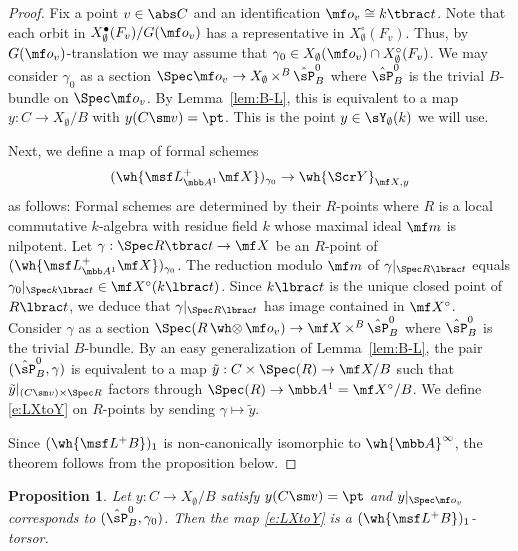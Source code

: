 \documentclass[final]{amsart}
\newtheorem{prop}[subsubsection]{Proposition}
\theoremstyle{remark}
\theoremstyle{definition}
\DeclareMathOperator*{\xt}{\times}
\DeclareMathOperator*{\hot}{\wh\otimes}
\numberwithin{equation}{section}
\begin{document}
\begin{proof}
Fix a point $v \in \abs C$ and an identification $\mf o_v \cong k\tbrac t$. 
Note that each orbit in $X_\emptyset^\bullet(F_v)/G(\mf o_v)$
has a representative in $X_\emptyset^\circ(F_v)$. 
Thus, by $G(\mf o_v)$-translation we may assume that $\gamma_0 \in X_\emptyset(\mf o_v) \cap X_\emptyset^\circ(F_v)$.
We may consider $\gamma_0$ as a section $\Spec \mf o_v \to X_\emptyset \xt^B \hat\sP_B^0$
where $\hat\sP_B^0$ is the trivial $B$-bundle on $\Spec \mf o_v$. 
By Lemma~\ref{lem:B-L}, this is equivalent to a map
$y: C \to X_\emptyset/B$ with $y(C\sm v) = \pt$. 
This is the point $y\in \sY_\emptyset(k)$ we will use. 

\smallskip

Next, we define a map of formal schemes
\begin{equation}  \label{e:LXtoY}
(\wh{\msf L^+_{\mbb A^1} \mf X})_{\gamma_0} \to \wh{\Scr Y}_{\mf X,y} 
\end{equation}
as follows: 
Formal schemes are determined by
their $R$-points where $R$ is a local commutative
$k$-algebra with residue field $k$ whose maximal ideal $\mf m$ is nilpotent. 
Let $\gamma : \Spec R\tbrac t \to \mf X$ be an $R$-point 
of $(\wh{\msf L^+_{\mbb A^1} \mf X})_{\gamma_0}$. 
The reduction modulo $\mf m$ of $\gamma|_{\Spec R\lbrac t}$ 
equals $\gamma_0|_{\Spec k\lbrac t} \in \mf X^\circ(k\lbrac t)$. 
Since $k\lbrac t$ is the unique closed point of $R\lbrac t$, 
we deduce that $\gamma|_{\Spec R\lbrac t}$ has image contained in $\mf X^\circ$. 
Consider $\gamma$ as a section $\Spec(R \hot \mf o_v) \to \mf X \xt^B \hat\sP_B^0$
where $\hat\sP_B^0$ is the trivial $B$-bundle. 
By an easy generalization of Lemma~\ref{lem:B-L}, 
the pair $(\hat\sP^0_B, \gamma)$ is equivalent to a map 
$\tilde y : C\times \Spec(R) \to \mf X/B$
such that $\tilde y|_{(C\sm v)\times \Spec R}$
factors through $\Spec(R) \to \mbb A^1 = \mf X^\circ/B$.
We define \eqref{e:LXtoY} on $R$-points by sending 
$\gamma \mapsto \tilde y$.

Since $(\wh{\msf L^+ B})_1$ is non-canonically isomorphic to 
$\wh{\mbb A}^\infty$, the theorem follows from 
the proposition below. 
\end{proof}

\begin{prop}\label{prop:DGKtorsor}
Let $y : C\to X_\emptyset/B$ satisfy $y(C\sm v)=\pt$ and $y|_{\Spec \mf o_v}$ corresponds
to $(\hat\sP_B^0, \gamma_0)$. 
Then the map \eqref{e:LXtoY} is a $(\wh{\msf L^+ B})_1$-torsor. 
\end{prop}
\end{document}
